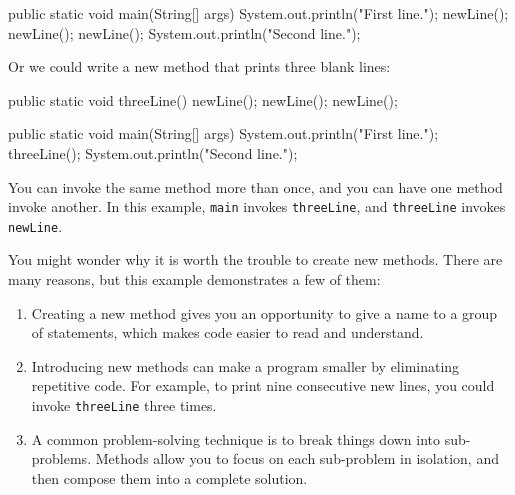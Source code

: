 \documentclass[12pt]{book}
\theoremstyle{exercise}
\newcommand{\java}[1]{\verb"#1"}
\newcommand{\java}[1]{\lstinline{#1}} %
\begin{document}
\begin{code}
    public static void main(String[] args) {
        System.out.println("First line.");
        newLine();
        newLine();
        newLine();
        System.out.println("Second line.");
    }
\end{code}

Or we could write a new method that prints three blank lines:

\begin{code}
    public static void threeLine() {
        newLine();
        newLine();
        newLine();
    }

    public static void main(String[] args) {
        System.out.println("First line.");
        threeLine();
        System.out.println("Second line.");
    }
\end{code}

You can invoke the same method more than once, and you can have one method invoke another.
In this example, \java{main} invokes \java{threeLine}, and \java{threeLine} invokes \java{newLine}.

You might wonder why it is worth the trouble to create new methods.
There are many reasons, but this example demonstrates a few of them:

\begin{enumerate}

\item Creating a new method gives you an opportunity to give a name to a group of statements, which makes code easier to read and understand.

\item Introducing new methods can make a program smaller by eliminating repetitive code.
For example, to print nine consecutive new lines, you could invoke \java{threeLine} three times.

\item A common problem-solving technique is to break things down into sub-problems.
Methods allow you to focus on each sub-problem in isolation, and then compose them into a complete solution.

\end{enumerate}

\end{document}
